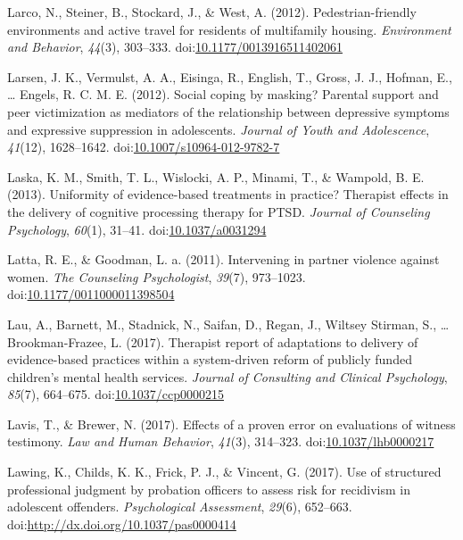 \documentclass[english,man]{apa6}
\theoremstyle{definition}
\theoremstyle{definition}
\theoremstyle{definition}
\theoremstyle{remark}
\begin{document}
\hypertarget{ref-Larco2012}{}
Larco, N., Steiner, B., Stockard, J., \& West, A. (2012).
Pedestrian-friendly environments and active travel for residents of
multifamily housing. \emph{Environment and Behavior}, \emph{44}(3),
303--333.
doi:\href{https://doi.org/10.1177/0013916511402061}{10.1177/0013916511402061}

\hypertarget{ref-Larsen2012}{}
Larsen, J. K., Vermulst, A. A., Eisinga, R., English, T., Gross, J. J.,
Hofman, E., \ldots{} Engels, R. C. M. E. (2012). Social coping by
masking? Parental support and peer victimization as mediators of the
relationship between depressive symptoms and expressive suppression in
adolescents. \emph{Journal of Youth and Adolescence}, \emph{41}(12),
1628--1642.
doi:\href{https://doi.org/10.1007/s10964-012-9782-7}{10.1007/s10964-012-9782-7}

\hypertarget{ref-Laska2013}{}
Laska, K. M., Smith, T. L., Wislocki, A. P., Minami, T., \& Wampold, B.
E. (2013). Uniformity of evidence-based treatments in practice?
Therapist effects in the delivery of cognitive processing therapy for
PTSD. \emph{Journal of Counseling Psychology}, \emph{60}(1), 31--41.
doi:\href{https://doi.org/10.1037/a0031294}{10.1037/a0031294}

\hypertarget{ref-Latta2011}{}
Latta, R. E., \& Goodman, L. a. (2011). Intervening in partner violence
against women. \emph{The Counseling Psychologist}, \emph{39}(7),
973--1023.
doi:\href{https://doi.org/10.1177/0011000011398504}{10.1177/0011000011398504}

\hypertarget{ref-Lau2017}{}
Lau, A., Barnett, M., Stadnick, N., Saifan, D., Regan, J., Wiltsey
Stirman, S., \ldots{} Brookman-Frazee, L. (2017). Therapist report of
adaptations to delivery of evidence-based practices within a
system-driven reform of publicly funded children's mental health
services. \emph{Journal of Consulting and Clinical Psychology},
\emph{85}(7), 664--675.
doi:\href{https://doi.org/10.1037/ccp0000215}{10.1037/ccp0000215}

\hypertarget{ref-Lavis2017}{}
Lavis, T., \& Brewer, N. (2017). Effects of a proven error on
evaluations of witness testimony. \emph{Law and Human Behavior},
\emph{41}(3), 314--323.
doi:\href{https://doi.org/10.1037/lhb0000217}{10.1037/lhb0000217}

\hypertarget{ref-Lawing2017}{}
Lawing, K., Childs, K. K., Frick, P. J., \& Vincent, G. (2017). Use of
structured professional judgment by probation officers to assess risk
for recidivism in adolescent offenders. \emph{Psychological Assessment},
\emph{29}(6), 652--663.
doi:\href{https://doi.org/http://dx.doi.org/10.1037/pas0000414}{http://dx.doi.org/10.1037/pas0000414}
\end{document}
